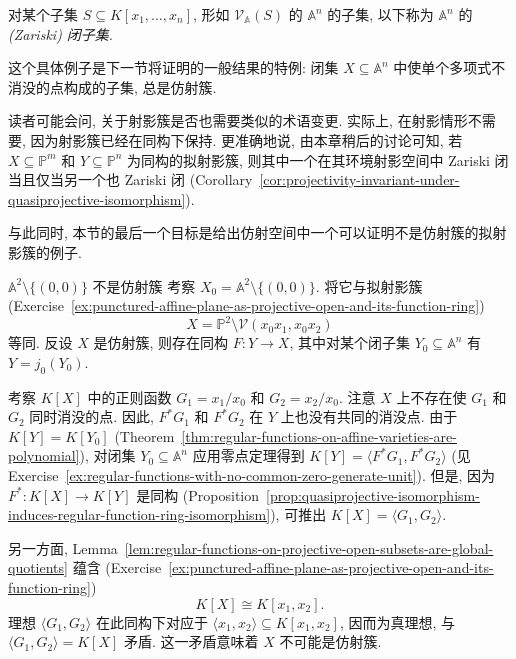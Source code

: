 \begin{BookTerminologyChange}\leavevmode\label{def:affine-vanishing-sets-are-called-zariski-closed-subsets}
对某个子集 $S\subseteq K[x_{1},\ldots,x_{n}]$, 形如 $\mathcal{V}_{\mathbb{A}}(S)$ 的 $\mathbb{A}^{n}$ 的子集, 以下称为 $\mathbb{A}^{n}$ 的 \emph{(Zariski) 闭子集}.
\end{BookTerminologyChange}

这个具体例子是下一节将证明的一般结果的特例: 闭集 $X\subseteq\mathbb{A}^{n}$ 中使单个多项式不消没的点构成的子集, 总是仿射簇.

读者可能会问, 关于射影簇是否也需要类似的术语变更. 实际上, 在射影情形不需要, 因为射影簇已经在同构下保持. 更准确地说, 由本章稍后的讨论可知, 若 $X\subseteq\mathbb{P}^{m}$ 和 $Y\subseteq\mathbb{P}^{n}$ 为同构的拟射影簇, 则其中一个在其环境射影空间中 Zariski 闭当且仅当另一个也 Zariski 闭 (Corollary~\ref{cor:projectivity-invariant-under-quasiprojective-isomorphism}).

与此同时, 本节的最后一个目标是给出仿射空间中一个可以证明不是仿射簇的拟射影簇的例子.

\begin{Example}{$\mathbb{A}^{2}\setminus\{(0,0)\}$ 不是仿射簇}\leavevmode\label{ex:punctured-affine-plane-is-not-affine}
考察 $X_{0}=\mathbb{A}^{2}\setminus\{(0,0)\}$. 将它与拟射影簇 (Exercise~\ref{ex:punctured-affine-plane-as-projective-open-and-its-function-ring})
\[
  X=\mathbb{P}^{2}\setminus\mathcal{V}(x_{0}x_{1},x_{0}x_{2})
\]
等同. 反设 $X$ 是仿射簇, 则存在同构 $F:Y\to X$, 其中对某个闭子集 $Y_{0}\subseteq\mathbb{A}^{n}$ 有 $Y=j_{0}(Y_{0})$.

考察 $K[X]$ 中的正则函数 $G_{1}=x_{1}/x_{0}$ 和 $G_{2}=x_{2}/x_{0}$. 注意 $X$ 上不存在使 $G_{1}$ 和 $G_{2}$ 同时消没的点. 因此, $F^{*}G_{1}$ 和 $F^{*}G_{2}$ 在 $Y$ 上也没有共同的消没点. 由于 $K[Y]=K[Y_{0}]$ (Theorem~\ref{thm:regular-functions-on-affine-varieties-are-polynomial}), 对闭集 $Y_{0}\subseteq\mathbb{A}^{n}$ 应用零点定理得到 $K[Y]=\langle F^{*}G_{1},F^{*}G_{2}\rangle$ (见 Exercise~\ref{ex:regular-functions-with-no-common-zero-generate-unit}). 但是, 因为 $F^{*}:K[X]\to K[Y]$ 是同构 (Proposition~\ref{prop:quasiprojective-isomorphism-induces-regular-function-ring-isomorphism}), 可推出 $K[X]=\langle G_{1},G_{2}\rangle$.

另一方面, Lemma~\ref{lem:regular-functions-on-projective-open-subsets-are-global-quotients} 蕴含 (Exercise~\ref{ex:punctured-affine-plane-as-projective-open-and-its-function-ring})
\[
  K[X]\cong K[x_{1},x_{2}].
\]
理想 $\langle G_{1},G_{2}\rangle$ 在此同构下对应于 $\langle x_{1},x_{2}\rangle\subseteq K[x_{1},x_{2}]$, 因而为真理想, 与 $\langle G_{1},G_{2}\rangle=K[X]$ 矛盾. 这一矛盾意味着 $X$ 不可能是仿射簇.
\end{Example}


